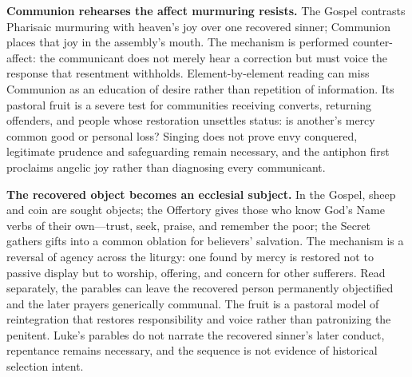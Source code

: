 \noindent\textbf{Communion rehearses the affect murmuring resists.\enspace{}}
The Gospel contrasts Pharisaic murmuring with heaven's joy over one recovered sinner; Communion places that joy in the assembly's mouth. The mechanism is performed counter-affect: the communicant does not merely hear a correction but must voice the response that resentment withholds. Element-by-element reading can miss Communion as an education of desire rather than repetition of information. Its pastoral fruit is a severe test for communities receiving converts, returning offenders, and people whose restoration unsettles status: is another's mercy common good or personal loss? Singing does not prove envy conquered, legitimate prudence and safeguarding remain necessary, and the antiphon first proclaims angelic joy rather than diagnosing every communicant.

\noindent\textbf{The recovered object becomes an ecclesial subject.\enspace{}}
In the Gospel, sheep and coin are sought objects; the Offertory gives those who know God's Name verbs of their own---trust, seek, praise, and remember the poor; the Secret gathers gifts into a common oblation for believers' salvation. The mechanism is a reversal of agency across the liturgy: one found by mercy is restored not to passive display but to worship, offering, and concern for other sufferers. Read separately, the parables can leave the recovered person permanently objectified and the later prayers generically communal. The fruit is a pastoral model of reintegration that restores responsibility and voice rather than patronizing the penitent. Luke's parables do not narrate the recovered sinner's later conduct, repentance remains necessary, and the sequence is not evidence of historical selection intent.
